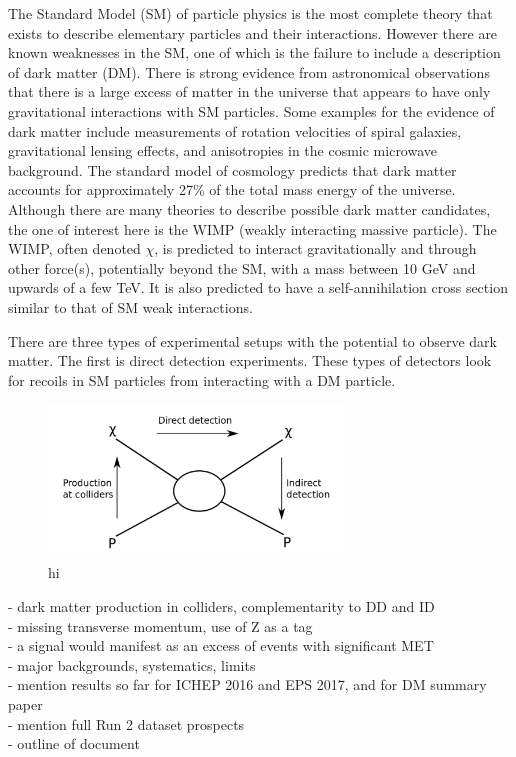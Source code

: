 \label{chapter:introduction}

The Standard Model (SM) of particle physics is the most complete theory that exists to describe elementary particles and their interactions. However there are known weaknesses in the SM, one of which is the failure to include a description of dark matter (DM). There is strong evidence from astronomical observations that there is a large excess of matter in the universe that appears to have only gravitational interactions with SM particles. Some examples for the evidence of dark matter include measurements of rotation velocities of spiral galaxies, gravitational lensing effects, and anisotropies in the cosmic microwave background. The standard model of cosmology predicts that dark matter accounts for approximately 27\% of the total mass energy of the universe. Although there are many theories to describe possible dark matter candidates, the one of interest here is the WIMP (weakly interacting massive particle). The WIMP, often denoted $\chi$, is predicted to interact gravitationally and through other force(s), potentially beyond the SM, with a mass between 10 GeV and upwards of a few TeV. It is also predicted to have a self-annihilation cross section similar to that of SM weak interactions.

There are three types of experimental setups with the potential to observe dark matter. The first is direct detection experiments. These types of detectors look for recoils in SM particles from interacting with a DM particle.

\begin{figure}[htbp]
\centering
\includegraphics[width=0.7\textwidth]{Figures/DMDetection.png}
\caption{hi}
\label{fig:DMDetection}
\end{figure}



- dark matter production in colliders, complementarity to DD and ID\\
- missing transverse momentum, use of Z as a tag\\
- a signal would manifest as an excess of events with significant MET\\
- major backgrounds, systematics, limits\\
- mention results so far for ICHEP 2016 and EPS 2017, and for DM summary paper\\
- mention full Run 2 dataset prospects\\
- outline of document\\